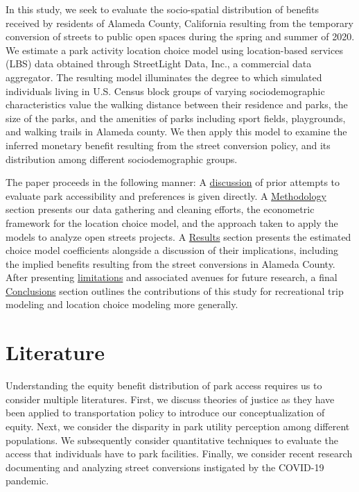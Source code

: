 \documentclass[3p, authoryear, review]{elsarticle} %
\begin{document}
In this study, we seek to evaluate the socio-spatial distribution of benefits
received by residents of Alameda County, California resulting from the
temporary conversion of streets to public open spaces during the spring and
summer of 2020. We estimate a park activity location choice model using
location-based services (LBS) data obtained through StreetLight Data, Inc., a
commercial data aggregator. The resulting model illuminates the degree to which
simulated individuals living in U.S. Census block groups of varying
sociodemographic characteristics value the walking distance between their residence
and parks, the size of the parks, and the amenities of parks including sport
fields, playgrounds, and walking trails in Alameda county. We then apply this
model to examine the inferred monetary benefit resulting from the street
conversion policy, and its distribution among different sociodemographic groups.

The paper proceeds in the following manner: A \protect\hyperlink{literature}{discussion} of prior
attempts to evaluate park accessibility and preferences is given directly. A
\protect\hyperlink{methodology}{Methodology} section presents our data gathering and cleaning
efforts, the econometric framework for the location choice model, and the
approach taken to apply the models to analyze open streets projects. A
\protect\hyperlink{results}{Results} section presents the estimated choice model coefficients
alongside a discussion of their implications, including the implied benefits
resulting from the street conversions in Alameda County. After presenting
\protect\hyperlink{limitations}{limitations} and associated avenues for future research, a final
\protect\hyperlink{conclusions}{Conclusions} section outlines the contributions of this study for
recreational trip modeling and location choice modeling more generally.

\hypertarget{literature}{%
\section{Literature}\label{literature}}

Understanding the equity benefit distribution of park access requires us to
consider multiple literatures. First, we discuss theories of justice as they have been applied to transportation policy to introduce our conceptualization of equity. Next, we consider the
disparity in park utility perception among different populations. We
subsequently consider quantitative techniques to evaluate the access that
individuals have to park facilities. Finally, we consider recent research
documenting and analyzing street conversions instigated by the COVID-19
pandemic.
\end{document}
